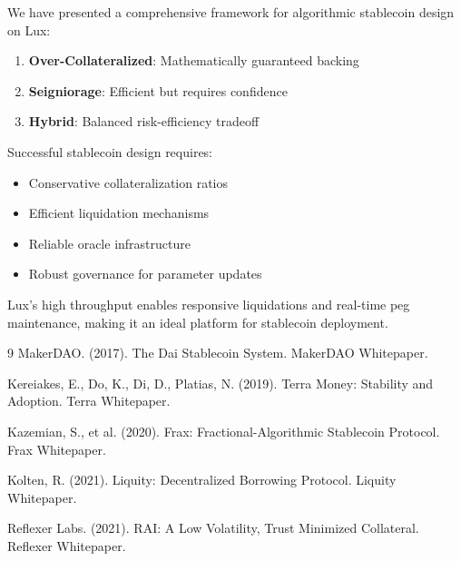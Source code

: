 \documentclass[11pt,a4paper]{article}
\theoremstyle{definition}
\begin{document}
We have presented a comprehensive framework for algorithmic stablecoin design on Lux:

\begin{enumerate}
\item \textbf{Over-Collateralized}: Mathematically guaranteed backing
\item \textbf{Seigniorage}: Efficient but requires confidence
\item \textbf{Hybrid}: Balanced risk-efficiency tradeoff
\end{enumerate}

Successful stablecoin design requires:
\begin{itemize}
\item Conservative collateralization ratios
\item Efficient liquidation mechanisms
\item Reliable oracle infrastructure
\item Robust governance for parameter updates
\end{itemize}

Lux's high throughput enables responsive liquidations and real-time peg maintenance, making it an ideal platform for stablecoin deployment.

\begin{thebibliography}{9}
MakerDAO. (2017). The Dai Stablecoin System. MakerDAO Whitepaper.

Kereiakes, E., Do, K., Di, D., Platias, N. (2019). Terra Money: Stability and Adoption. Terra Whitepaper.

Kazemian, S., et al. (2020). Frax: Fractional-Algorithmic Stablecoin Protocol. Frax Whitepaper.

Kolten, R. (2021). Liquity: Decentralized Borrowing Protocol. Liquity Whitepaper.

Reflexer Labs. (2021). RAI: A Low Volatility, Trust Minimized Collateral. Reflexer Whitepaper.
\end{thebibliography}
\end{document}
